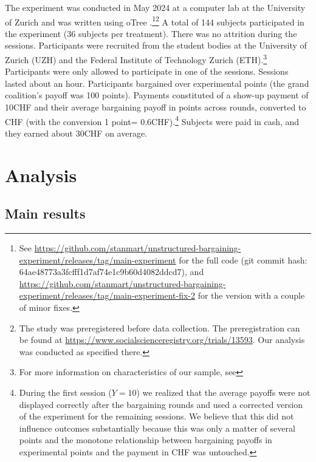 The experiment was conducted in May 2024 at a computer lab at the University of Zurich and was written using oTree \parencite{CHEN201688}.\footnote{See \href{https://github.com/stanmart/unstructured-bargaining-experiment/releases/tag/main-experiment}{https://github.com/stanmart/unstructured-bargaining-experiment/releases/tag/main-experiment} for the full code (git commit hash: 64ae48773a3fcfff1d7af74e1c9b60d4082ddcd7), and \href{https://github.com/stanmart/unstructured-bargaining-experiment/releases/tag/main-experiment-fix-2}{https://github.com/stanmart/unstructured-bargaining-experiment/releases/tag/main-experiment-fix-2} for the version with a couple of minor fixes.}\footnote{The study was preregistered before data collection. The preregistration can be found at \href{https://www.socialscienceregistry.org/trials/13593}{https://www.socialscienceregistry.org/trials/13593}. Our analysis was conducted as specified there.} A total of 144 subjects participated in the experiment (36 subjects per treatment). There was no attrition during the sessions. Participants were recruited from the student bodies at the University of Zurich (UZH) and the Federal Institute of Technology Zurich (ETH).\footnote{For more information on characteristics of our sample, see } Participants were only allowed to participate in one of the sessions. Sessions lasted about an hour. Participants bargained over experimental points (the grand coalition's payoff was 100 points). Payments constituted of a show-up payment of 10CHF and their average bargaining payoff in points across rounds, converted to CHF (with the conversion 1 point= 0.6CHF).\footnote{During the first session ($Y = 10$) we realized that the average payoffs were not displayed correctly after the bargaining rounds and used a corrected version of the experiment for the remaining sessions. We believe that this did not influence outcomes substantially  because this was only a matter of several points and the monotone relationship between bargaining payoffs in experimental points and the payment in CHF was untouched.} Subjects were paid in cash, and they earned about 30CHF on average. 
 



\section{Analysis} \label{sec:analysis}

\subsection{Main results}

